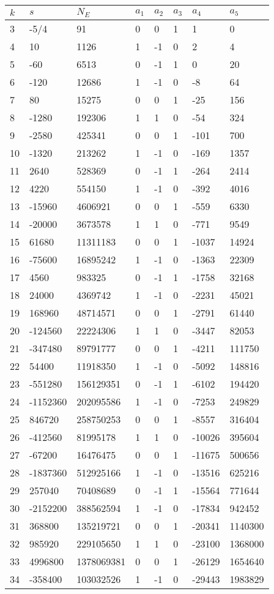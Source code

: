 \documentclass{amsart}
\begin{document}
\begin{longtable}{|l|l|l|lllll|}
\hline
$k$ & $s$ & $N_E$ & $a_1$ & $a_2$ & $a_3$ & $a_4$ & $a_5$\\
\hline
3&-5/4&91&0&0&1&1&0\\
4&10&1126&1&-1&0&2&4\\
5&-60&6513&0&-1&1&0&20\\
6&-120&12686&1&-1&0&-8&64\\
7&80&15275&0&0&1&-25&156\\
8&-1280&192306&1&1&0&-54&324\\
9&-2580&425341&0&0&1&-101&700\\
10&-1320&213262&1&-1&0&-169&1357\\
11&2640&528369&0&-1&1&-264&2414\\
12&4220&554150&1&-1&0&-392&4016\\
13&-15960&4606921&0&0&1&-559&6330\\
14&-20000&3673578&1&1&0&-771&9549\\
15&61680&11311183&0&0&1&-1037&14924\\
16&-75600&16895242&1&-1&0&-1363&22309\\
17&4560&983325&0&-1&1&-1758&32168\\
18&24000&4369742&1&-1&0&-2231&45021\\
19&168960&48714571&0&0&1&-2791&61440\\
20&-124560&22224306&1&1&0&-3447&82053\\
21&-347480&89791777&0&0&1&-4211&111750\\
22&54400&11918350&1&-1&0&-5092&148816\\
23&-551280&156129351&0&-1&1&-6102&194420\\
24&-1152360&202095586&1&-1&0&-7253&249829\\
25&846720&258750253&0&0&1&-8557&316404\\
26&-412560&81995178&1&1&0&-10026&395604\\
27&-67200&16476475&0&0&1&-11675&500656\\
28&-1837360&512925166&1&-1&0&-13516&625216\\
29&257040&70408689&0&-1&1&-15564&771644\\
30&-2152200&388562594&1&-1&0&-17834&942452\\
31&368800&135219721&0&0&1&-20341&1140300\\
32&985920&229105650&1&1&0&-23100&1368000\\
33&4996800&1378069381&0&0&1&-26129&1654640\\
34&-358400&103032526&1&-1&0&-29443&1983829\\

\end{longtable}
\end{document}
